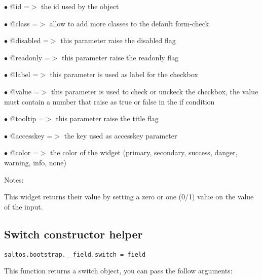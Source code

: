 \documentclass[a4paper]{book}
\begin{document}
\begin{compactitem}
\item[\color{myblue}$\bullet$] @id        =$>$ the id used by the object
\item[\color{myblue}$\bullet$] @class     =$>$ allow to add more classes to the default form-check
\item[\color{myblue}$\bullet$] @disabled  =$>$ this parameter raise the disabled flag
\item[\color{myblue}$\bullet$] @readonly  =$>$ this parameter raise the readonly flag
\item[\color{myblue}$\bullet$] @label     =$>$ this parameter is used as label for the checkbox
\item[\color{myblue}$\bullet$] @value     =$>$ this parameter is used to check or unckeck the checkbox, the value
              must contain a number that raise as true or false in the if condition
\item[\color{myblue}$\bullet$] @tooltip   =$>$ this parameter raise the title flag
\item[\color{myblue}$\bullet$] @accesskey =$>$ the key used as accesskey parameter
\item[\color{myblue}$\bullet$] @color     =$>$ the color of the widget (primary, secondary, success, danger, warning, info, none)
\end{compactitem}

Notes:

This widget returns their value by setting a zero or one (0/1) value on the value of the input.

\hypertarget{toc475}{}
\subsection{Switch constructor helper}

\begin{lstlisting}
saltos.bootstrap.__field.switch = field
\end{lstlisting}

This function returns a switch object, you can pass the follow arguments:
\end{document}
